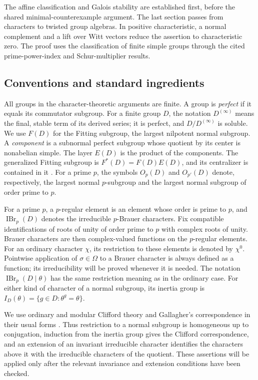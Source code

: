 \documentclass[11pt,a4paper]{amsart}
\DeclareMathOperator{\IBr}{IBr}
\theoremstyle{remark}
\numberwithin{equation}{section}
\begin{document}
The affine classification and Galois stability are established first,
before the shared minimal-counterexample argument.
The last section passes from characters to twisted group algebras.
In positive characteristic, a normal complement and a lift over
Witt vectors reduce the assertion to characteristic zero.
The proof uses the classification of finite simple groups through
the cited prime-power-index and Schur-multiplier results.

\subsection*{Conventions and standard ingredients}

All groups in the character-theoretic arguments are finite.
A group is \emph{perfect} if it equals its commutator subgroup.
For a finite group $D$, the notation $D^{(\infty)}$ means the final,
stable term of its derived series; it is perfect, and
$D/D^{(\infty)}$ is soluble.
We use $F(D)$ for the Fitting subgroup, the largest nilpotent normal
subgroup. A \emph{component} is a subnormal perfect subgroup whose
quotient by its center is nonabelian simple. The layer $E(D)$ is
the product of the components. The generalized Fitting subgroup is
$F^*(D)=F(D)E(D)$, and its centralizer is contained in it
\cite{IsaacsGroups}.
For a prime $p$, the symbols $O_p(D)$ and $O_{p'}(D)$ denote,
respectively, the largest normal $p$-subgroup and the largest
normal subgroup of order prime to $p$.

For a prime $p$, a $p$-regular element is an element whose order is
prime to $p$, and $\IBr_p(D)$ denotes the irreducible $p$-Brauer
characters. Fix compatible identifications of roots of unity of
order prime to $p$ with complex roots of unity. Brauer characters
are then complex-valued functions on the $p$-regular elements.
For an ordinary character $\chi$, its restriction to these elements
is denoted by $\chi^0$. Pointwise application of $\sigma\in\Omega$
to a Brauer character is always defined as a function; its
irreducibility will be proved whenever it is needed.
The notation $\IBr_p(D\mid\theta)$ has the same restriction meaning
as in the ordinary case. For either kind of character of a normal
subgroup, its inertia group is
$I_D(\theta)=\{g\in D:\theta^g=\theta\}$.

We use ordinary and modular Clifford theory and Gallagher's
correspondence in their usual forms
\cite[Chapters~6 and~11]{Isaacs}\cite[Theorems~4.6--4.8]{Vallejo}.
Thus restriction to a normal subgroup is homogeneous up to
conjugation, induction from the inertia group gives the Clifford
correspondence, and an extension of an invariant irreducible
character identifies the characters above it with the irreducible
characters of the quotient. These assertions will be applied only
after the relevant invariance and extension conditions have been
checked.
\end{document}
